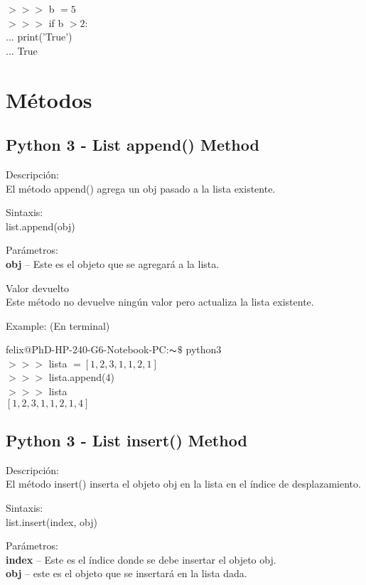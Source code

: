 \documentclass[12pt,openany]{scrbook}
\begin{document}
$>>>$ b $= 5$ \\
$>>>$ if b $> 2$: \\
$...$ \qquad \quad print('True') \\
$...$ 
True



\section{M\'etodos}


\subsection{Python 3 - List append() Method}

Descripci\'on:\\
El m\'etodo append() agrega un obj pasado a la lista existente.

Sintaxis:\\
list.append(obj)

Par\'ametros:\\
\textbf{obj} -- Este es el objeto que se agregar\'a a la lista.

Valor devuelto\\
Este m\'etodo no devuelve ning\'un valor pero actualiza la lista existente.

Example:
(En terminal)

felix@PhD-HP-240-G6-Notebook-PC:$\thicksim$\vspace{0cm}$\$$   python3 \\
$>>>$ lista $= [1,2,3,1,1,2,1]$\\
$>>>$ lista.append(4)\\
$>>>$ lista\\
$[1, 2, 3, 1, 1, 2, 1, 4]$


\subsection{Python 3 - List insert() Method}

Descripci\'on:\\
El m\'etodo insert() inserta el objeto obj en la lista en el \'indice de desplazamiento.

Sintaxis:\\
list.insert(index, obj)

Par\'ametros:\\
	\textbf{index} -- Este es el \'indice donde se debe insertar el objeto obj.\\
	\textbf{obj} -- este es el objeto que se insertará en la lista dada.
\end{document}
